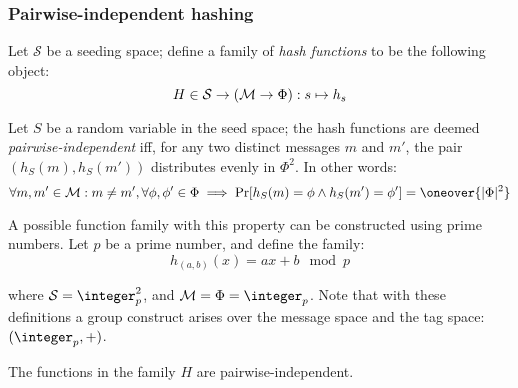 \subsubsection{Pairwise-independent hashing}

\begin{definition}
    Let $\mathcal{S}$ be a seeding space; define a family of \emph{hash functions} to be the following object\footnotemark:
    \[
        H \in \mathcal{S} \to (\mathcal{M} \to \Phi) : s \mapsto h_s
    \]


    Let $S$ be a random variable in the seed space; the hash functions are deemed \emph{pairwise-independent}\footnotemark{} iff, for any two distinct messages $m$ and $m'$, the pair $(h_S(m), h_S(m'))$ distributes evenly in $\Phi^2$. In other words:
    \[
        \forall m, m' \in \M : m \neq m', \forall \phi, \phi' \in \Phi \implies \Pr[h_S(m) = \phi \wedge h_S(m') = \phi'] = \oneover{|\Phi|^2}
    \]
\end{definition}


A possible function family with this property can be constructed using prime numbers. Let $p$ be a prime number, and define the family:
\[
    h_{(a, b)}(x) = ax + b \mod p
\]

where $\mathcal{S} = \integer_p^2$, and $\M = \Phi = \integer_p$. Note that with these definitions a group construct arises over the message space and the tag space: $(\integer_p, +)$.

\begin{theorem}
    The functions in the family $H$ are pairwise-independent.
\end{theorem}

